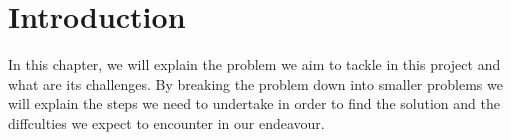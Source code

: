 \textbf{}%
\chapter{Introduction}\label{Introduction}
\ifpdf
    \graphicspath{{Introduction/IntroductionFigs/PNG/}{Introduction/IntroductionFigs/PDF/}{Introduction/IntroductionFigs/}}
\else
    \graphicspath{{Introduction/IntroductionFigs/EPS/}{Introduction/IntroductionFigs/}}
\fi

In this chapter, we will explain the problem we aim to tackle in this project and what are its challenges. By breaking
the problem down into smaller problems we will explain the steps we need to undertake in order to find the solution
and the diffculties we expect to encounter in our endeavour.

